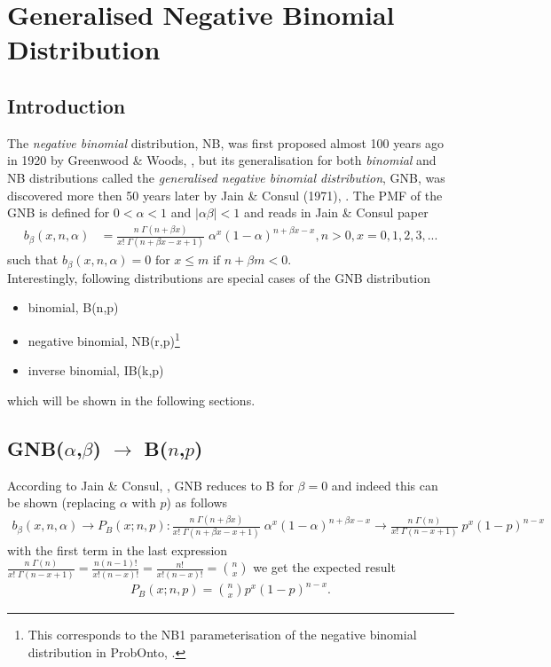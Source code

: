 \chapter{Generalised Negative Binomial Distribution}
\section{Introduction}
The \emph{negative binomial} distribution, NB, was first proposed almost 
100 years ago in 1920 by Greenwood \& Woods, \cite{greenwood1920inquiry}, 
but its generalisation for both \emph{binomial} and NB distributions called the 
\emph{generalised negative binomial distribution}, GNB, was discovered 
more then 50 years later by Jain \& Consul (1971), \cite{jain1971generalized}. 
The PMF of the GNB is defined for $0<\alpha<1$ and $|\alpha \beta| < 1$ 
and reads in Jain \& Consul paper
\begin{align*}
b_{\beta}(x,n,\alpha) &= 
\frac{n \; \Gamma(n+\beta x)}{x! \;\Gamma(n + \beta x - x +1)}  \; \alpha^x (1-\alpha)^{n+\beta x-x}, n>0, x=0,1,2,3,...
\end{align*}
such that $b_{\beta}(x,n,\alpha) = 0 \text{ for } x \leq m \text{ if } n+\beta m < 0.$\\
Interestingly, following distributions are special cases of the GNB distribution
\begin{itemize}
\item 
binomial, B(n,p)
\item 
negative binomial, NB(r,p)\footnote{This corresponds to the NB1 parameterisation 
of the negative binomial distribution in ProbOnto, \cite{Swat:2015a}.}
\item 
inverse binomial, IB(k,p)
\end{itemize}
which will be shown in the following sections. 

\section{GNB($\alpha$,$\beta$) $\rightarrow$ B($n$,$p$)}
According to Jain \& Consul, \cite{jain1971generalized}, GNB reduces to B for $\beta = 0$ and 
indeed this can be shown (replacing $\alpha$ with $p$) as follows
\begin{align*}
 b_{\beta}(x,n,\alpha) \rightarrow P_{B}(x;n,p): %
 \frac{n \; \Gamma(n+\beta x)}{x! \;\Gamma(n + \beta x - x +1)}  \; \alpha^x (1-\alpha)^{n+\beta x-x} \rightarrow 
\frac{n \; \Gamma(n)}{x! \;\Gamma(n - x +1)}  \; p^x (1-p	)^{n-x} 
\end{align*}
with the first term in the last expression $\frac{n \; \Gamma(n)}{x! \;\Gamma(n - x +1)} = \frac{n (n-1)!}{x! (n-x)!} 
= \frac{n!}{x!(n-x)!} = {n \choose x}$ we get the expected result
\begin{align*}
P_{B}(x;n,p) = {n \choose x} p^x (1-p)^{n-x}. %
\end{align*}


